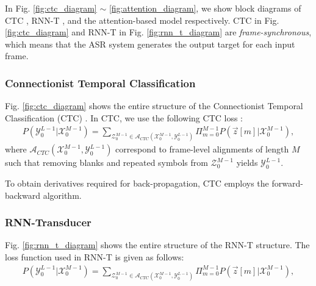 \documentclass{article}
\begin{document}
 In Fig. 
\ref{fig:ctc_diagram} $\sim$ \ref{fig:attention_diagram}, we show
block diagrams of CTC \cite{a_graves_icml_2006_00}, 
RNN-T \cite{a_graves_corr_2012_00, a_graves_icassp_2013_00}, and 
the attention-based model 
\cite{
j_chorowski_nips_2015_00,
w_chan_icassp_2016_00} respectively. CTC in Fig. \ref{fig:ctc_diagram} 
and RNN-T in Fig. \ref{fig:rnn_t_diagram} are {\it frame-synchronous}, 
which means that the ASR system generates the output target for each 
input frame.


\subsubsection{Connectionist Temporal Classification}
\label{sec:ctc}

Fig. \ref{fig:ctc_diagram} shows the entire structure of the 
Connectionist Temporal Classification (CTC) 
\cite{a_graves_icml_2006_00}. In CTC, we use the following CTC loss
\cite{a_graves_icml_2006_00, y_he_icassp_2019_00}:
\begin{align}
  P\left(\mathcal{Y}_{0}^{L-1} | \mathcal{X}_{0}^{M-1}\right) = 
    \sum_{\mathcal{Z}_{0}^{M-1} \in 
      \mathcal{A}_{CTC} 
        \left(\mathcal{X}_{0}^{M-1}, \mathcal{Y}_{0}^{L-1} \right)}
          \Pi_{m=0}^{M-1}
            P\left(\vec{z}[m] | \mathcal{X}_{0}^{M-1} \right),
\end{align}
where $\mathcal{A}_{CTC} \left(\mathcal{X}_{0}^{M-1}, 
\mathcal{Y}_{0}^{L-1} \right)$ correspond to frame-level alignments
of length $M$ such that removing blanks and repeated symbols from 
$\mathcal{Z}_{0}^{M-1}$ yields $\mathcal{Y}_{0}^{L-1}$.

To obtain derivatives required for back-propagation, CTC employs 
the forward-backward algorithm.



\subsubsection{RNN-Transducer}
\label{sec:rnn_t}

Fig. \ref{fig:rnn_t_diagram} shows the entire structure of the  
RNN-T structure. The loss function used in RNN-T is given as follows:
\begin{align}
  P\left(\mathcal{Y}_{0}^{L-1} | \mathcal{X}_{0}^{M-1}\right) = 
    \sum_{\mathcal{Z}_{0}^{M-1} \in 
      \mathcal{A}_{CTC} 
        \left(\mathcal{X}_{0}^{M-1}, \mathcal{Y}_{0}^{L-1} \right)}
          \Pi_{m=0}^{M-1}
            P\left(\vec{z}[m] | \mathcal{X}_{0}^{M-1} \right),
\end{align}
\end{document}
